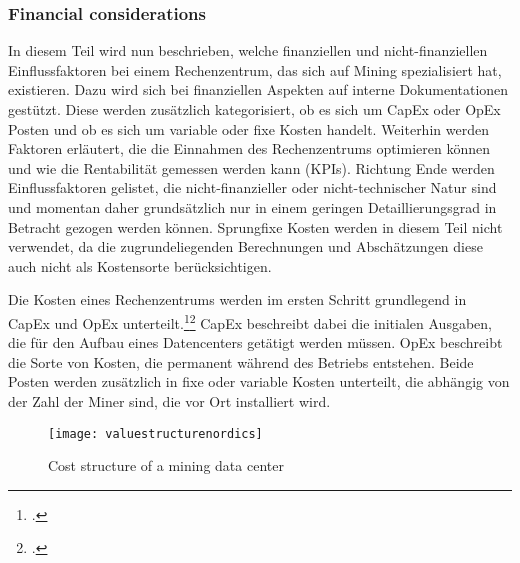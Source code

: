 \subsubsection{Financial considerations} \label{toc:kennzahlenundeinflussfaktoren}

In diesem Teil wird nun beschrieben, welche finanziellen und nicht-finanziellen Einflussfaktoren bei einem
Rechenzentrum, das sich auf Mining spezialisiert hat, existieren. Dazu wird sich bei finanziellen Aspekten auf interne
Dokumentationen gestützt. Diese werden zusätzlich kategorisiert, ob es sich um \ac{CapEx} oder \ac{OpEx} Posten und
ob es sich um variable oder fixe Kosten handelt. Weiterhin werden Faktoren erläutert, die die Einnahmen des Rechenzentrums
optimieren können und wie die Rentabilität gemessen werden kann (\acp{KPI}). Richtung Ende werden Einflussfaktoren
gelistet, die nicht-finanzieller oder nicht-technischer Natur sind und momentan daher grundsätzlich nur in einem geringen
Detaillierungsgrad in Betracht gezogen werden können. Sprungfixe Kosten werden in diesem Teil nicht verwendet, da die
zugrundeliegenden Berechnungen und Abschätzungen diese auch nicht als Kostensorte berücksichtigen.


Die Kosten eines Rechenzentrums werden im ersten Schritt grundlegend in \ac{CapEx} und \ac{OpEx}
unterteilt.\footcite[Cf.][]{appendix:capex}\footcite[Cf.][]{appendix:opex} \ac{CapEx} beschreibt dabei die initialen
Ausgaben, die für den Aufbau eines Datencenters getätigt werden müssen. \ac{OpEx} beschreibt die Sorte von Kosten, die permanent
während des Betriebs entstehen. Beide Posten werden zusätzlich in fixe oder variable Kosten unterteilt, die abhängig
von der Zahl der Miner sind, die vor Ort installiert wird.

\begin{figure}[H]
    \caption{Cost structure of a mining data center}
    \texttt{[image: valuestructurenordics]}
    \label{figure:valuestructurenordics}
\end{figure}

